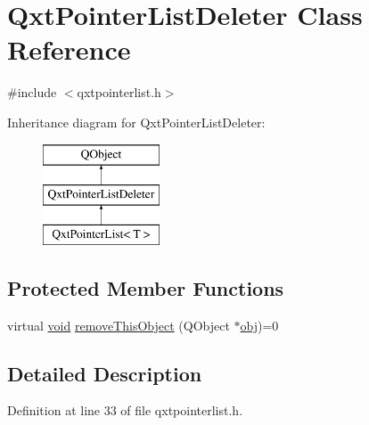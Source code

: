 \hypertarget{class_qxt_pointer_list_deleter}{\section{Qxt\-Pointer\-List\-Deleter Class Reference}
\label{class_qxt_pointer_list_deleter}
}


{\ttfamily \#include $<$qxtpointerlist.\-h$>$}

Inheritance diagram for Qxt\-Pointer\-List\-Deleter\-:\begin{figure}[H]
\begin{center}
\leavevmode
\includegraphics[height=3.000000cm]{class_qxt_pointer_list_deleter}
\end{center}
\end{figure}
\subsection*{Protected Member Functions}
\begin{DoxyCompactItemize}
\item 
virtual \hyperlink{group___u_a_v_objects_plugin_ga444cf2ff3f0ecbe028adce838d373f5c}{void} \hyperlink{class_qxt_pointer_list_deleter_a048d79c663f5b7d76e8f31dfd56ae778}{remove\-This\-Object} (Q\-Object $\ast$\hyperlink{glext_8h_a0c0d4701a6c89f4f7f0640715d27ab26}{obj})=0
\end{DoxyCompactItemize}


\subsection{Detailed Description}


Definition at line 33 of file qxtpointerlist.\-h.




